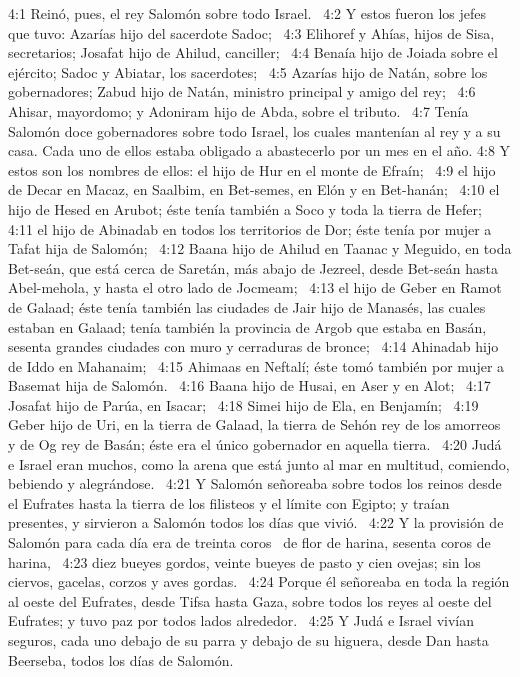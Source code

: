 4:1 Reinó, pues, el rey Salomón sobre todo Israel.  
4:2 Y estos fueron los jefes que tuvo: Azarías hijo del sacerdote Sadoc;  
4:3 Elihoref y Ahías, hijos de Sisa, secretarios; Josafat hijo de Ahilud, canciller;  
4:4 Benaía hijo de Joiada sobre el ejército; Sadoc y Abiatar, los sacerdotes;  
4:5 Azarías hijo de Natán, sobre los gobernadores; Zabud hijo de Natán, ministro principal y amigo del rey;  
4:6 Ahisar, mayordomo; y Adoniram hijo de Abda, sobre el tributo.  
4:7 Tenía Salomón doce gobernadores sobre todo Israel, los cuales mantenían al rey y a su casa. Cada uno de ellos estaba obligado a abastecerlo por un mes en el año. 
4:8 Y estos son los nombres de ellos: el hijo de Hur en el monte de Efraín;  
4:9 el hijo de Decar en Macaz, en Saalbim, en Bet-semes, en Elón y en Bet-hanán;  
4:10 el hijo de Hesed en Arubot; éste tenía también a Soco y toda la tierra de Hefer;  
4:11 el hijo de Abinadab en todos los territorios de Dor; éste tenía por mujer a Tafat hija de Salomón;  
4:12 Baana hijo de Ahilud en Taanac y Meguido, en toda Bet-seán, que está cerca de Saretán, más abajo de Jezreel, desde Bet-seán hasta Abel-mehola, y hasta el otro lado de Jocmeam;  
4:13 el hijo de Geber en Ramot de Galaad; éste tenía también las ciudades de Jair hijo de Manasés, las cuales estaban en Galaad; tenía también la provincia de Argob que estaba en Basán, sesenta grandes ciudades con muro y cerraduras de bronce;  
4:14 Ahinadab hijo de Iddo en Mahanaim;  
4:15 Ahimaas en Neftalí; éste tomó también por mujer a Basemat hija de Salomón.  
4:16 Baana hijo de Husai, en Aser y en Alot;  
4:17 Josafat hijo de Parúa, en Isacar;  
4:18 Simei hijo de Ela, en Benjamín;  
4:19 Geber hijo de Uri, en la tierra de Galaad, la tierra de Sehón rey de los amorreos y de Og rey de Basán; éste era el único gobernador en aquella tierra.  
4:20 Judá e Israel eran muchos, como la arena que está junto al mar en multitud, comiendo, bebiendo y alegrándose.  
4:21 Y Salomón señoreaba sobre todos los reinos desde el Eufrates hasta la tierra de los filisteos y el límite con Egipto; y traían presentes, y sirvieron a Salomón todos los días que vivió.  
4:22 Y la provisión de Salomón para cada día era de treinta coros  de flor de harina, sesenta coros de harina,  
4:23 diez bueyes gordos, veinte bueyes de pasto y cien ovejas; sin los ciervos, gacelas, corzos y aves gordas.  
4:24 Porque él señoreaba en toda la región al oeste del Eufrates, desde Tifsa hasta Gaza, sobre todos los reyes al oeste del Eufrates; y tuvo paz por todos lados alrededor.  
4:25 Y Judá e Israel vivían seguros, cada uno debajo de su parra y debajo de su higuera, desde Dan hasta Beerseba, todos los días de Salomón.  

